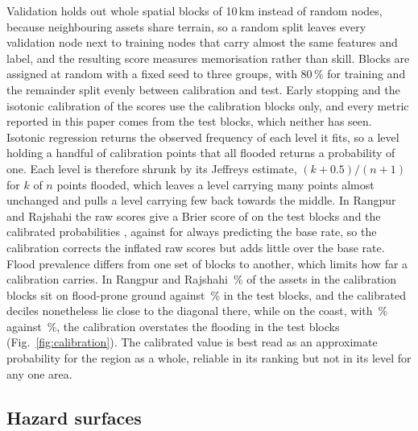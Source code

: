 \documentclass[11pt]{article}
\begin{document}
Validation holds out whole spatial blocks of 10\,km instead of random nodes, because neighbouring assets share terrain, so a random split leaves every validation node next to training nodes that carry almost the same features and label, and the resulting score measures memorisation rather than skill. Blocks are assigned at random with a fixed seed to three groups, with 80\,\% for training and the remainder split evenly between calibration and test. Early stopping and the isotonic calibration of the scores use the calibration blocks only, and every metric reported in this paper comes from the test blocks, which neither has seen. Isotonic regression returns the observed frequency of each level it fits, so a level holding a handful of calibration points that all flooded returns a probability of one. Each level is therefore shrunk by its Jeffreys estimate, $(k+0.5)/(n+1)$ for $k$ of $n$ points flooded, which leaves a level carrying many points almost unchanged and pulls a level carrying few back towards the middle. In Rangpur and Rajshahi the raw scores give a Brier score of \RRValBrier{} on the test blocks and the calibrated probabilities \RRValBrierCalibrated{}, against \RRValBrierBaseRate{} for always predicting the base rate, so the calibration corrects the inflated raw scores but adds little over the base rate. Flood prevalence differs from one set of blocks to another, which limits how far a calibration carries. In Rangpur and Rajshahi \RRCalibBlockRate{}\,\% of the assets in the calibration blocks sit on flood-prone ground against \RRTestBlockRate{}\,\% in the test blocks, and the calibrated deciles nonetheless lie close to the diagonal there, while on the coast, with \CoastalCalibBlockRate{}\,\% against \CoastalTestBlockRate{}\,\%, the calibration overstates the flooding in the test blocks (Fig.~\ref{fig:calibration}). The calibrated value is best read as an approximate probability for the region as a whole, reliable in its ranking but not in its level for any one area.

\subsection*{Hazard surfaces}
\end{document}
